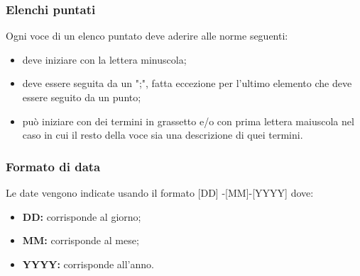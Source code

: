 \subsubsection{Elenchi puntati}
Ogni voce di un elenco puntato deve aderire alle norme seguenti: 
\begin{itemize}
	\item deve iniziare con la lettera minuscola;
	\item deve essere seguita da un ";", fatta eccezione per l’ultimo elemento che deve essere seguito da un punto; 
	\item può iniziare con dei termini in grassetto e/o con prima lettera maiuscola nel caso in cui il resto della voce sia una descrizione di quei termini.
\end{itemize}
\subsubsection{Formato di data}
Le date vengono indicate usando il formato
[DD] -[MM]-[YYYY] dove:
\begin{itemize}
\item \textbf{DD:} corrisponde al giorno;
	\item \textbf{MM:} corrisponde al mese;
		\item \textbf{YYYY:} corrisponde all'anno.
\end{itemize}
